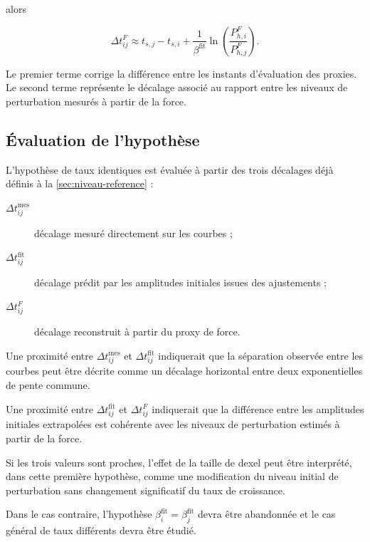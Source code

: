 \documentclass[
    11pt,
    a4paper
]{article}
\begin{document}
alors

\begin{equation}
    \Delta t_{ij}^{F}
    \approx
    t_{s,j}-t_{s,i}
    +
    \frac{1}{\beta^{\mathrm{fit}}}
    \ln\left(
        \frac{P_{h,i}^{F}}
        {P_{h,j}^{F}}
    \right).
    \label{eq:dt-force-beta-identiques-simplifie}
\end{equation}

Le premier terme corrige la différence entre les instants d’évaluation des
proxies. Le second terme représente le décalage associé au rapport entre les
niveaux de perturbation mesurés à partir de la force.

\subsection{Évaluation de l’hypothèse}
\label{subsec:evaluation-beta-identiques}

L’hypothèse de taux identiques est évaluée à partir des trois décalages déjà
définis à la \ref{sec:niveau-reference} :

\begin{description}
    \item[\(\Delta t_{ij}^{\mathrm{mes}}\)]
    décalage mesuré directement sur les courbes ;

    \item[\(\Delta t_{ij}^{\mathrm{fit}}\)]
    décalage prédit par les amplitudes initiales issues des ajustements ;

    \item[\(\Delta t_{ij}^{F}\)]
    décalage reconstruit à partir du proxy de force.
\end{description}

Une proximité entre
\(\Delta t_{ij}^{\mathrm{mes}}\) et
\(\Delta t_{ij}^{\mathrm{fit}}\) indiquerait que la séparation observée entre les
courbes peut être décrite comme un décalage horizontal entre deux exponentielles
de pente commune.

Une proximité entre
\(\Delta t_{ij}^{\mathrm{fit}}\) et
\(\Delta t_{ij}^{F}\) indiquerait que la différence entre les amplitudes initiales
extrapolées est cohérente avec les niveaux de perturbation estimés à partir de
la force.

Si les trois valeurs sont proches, l’effet de la taille de dexel peut être
interprété, dans cette première hypothèse, comme une modification du niveau
initial de perturbation sans changement significatif du taux de croissance.

Dans le cas contraire, l’hypothèse
\(\beta_i^{\mathrm{fit}}=\beta_j^{\mathrm{fit}}\) devra être abandonnée et le cas
général de taux différents devra être étudié.
\end{document}
